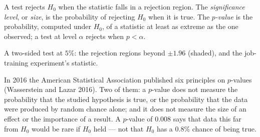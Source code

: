 \begin{definition}\label{def:b1:sampling-and-inference:p-value}
A test rejects $H_0$ when the statistic falls in a rejection region. The
\emph{significance level}, or \emph{size}, is the probability of rejecting $H_0$ when it is
true. The \emph{$p$-value} is the probability, computed under $H_0$, of a statistic at least
as extreme as the one observed; a test at level $\alpha$ rejects when $p < \alpha$.
\end{definition}

\begin{omfigure}

{\small A two-sided test at $5\%$: the rejection regions beyond $\pm 1.96$
(shaded), and the job-training experiment's statistic.}
\end{omfigure}

\begin{record}
In 2016 the American Statistical Association published six principles on
$p$-values (Wasserstein and Lazar 2016). Two of them: a $p$-value does not
measure the probability that the studied hypothesis is true, or the
probability that the data were produced by random chance alone; and it does
not measure the size of an effect or the importance of a result. %
A $p$-value of $0.008$ says that data this far from $H_0$ would be rare if $H_0$ held
--- not that $H_0$ has a $0.8\%$ chance of being true.
\end{record}

